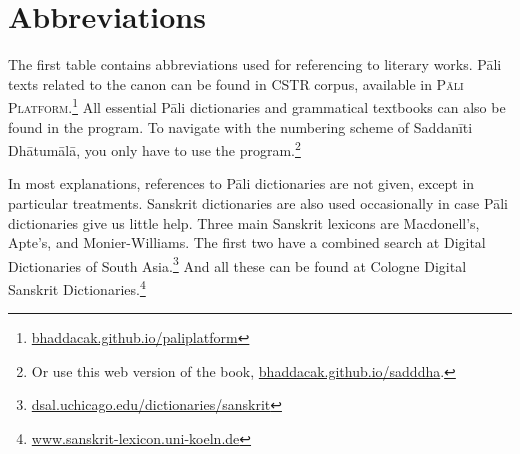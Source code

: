 \clearpage
{}
{}
\setcounter{footnote}{0}
\chapter*{Abbreviations}

The first table contains abbreviations used for referencing to literary works. Pāli texts related to the canon can be found in CSTR corpus, available in \textsc{Pāli\,Platform}.\footnote{\url{bhaddacak.github.io/paliplatform}} All essential Pāli dictionaries and grammatical textbooks can also be found in the program. To navigate with the numbering scheme of Saddanīti Dhātumālā, you only have to use the program.\footnote{Or use this web version of the book, \url{bhaddacak.github.io/sadddha}.}

In most explanations, references to Pāli dictionaries are not given, except in particular treatments. Sanskrit dictionaries are also used occasionally in case Pāli dictionaries give us little help. Three main Sanskrit lexicons are Macdonell's, Apte's, and Monier-Williams. The first two have a combined search at Digital Dictionaries of South Asia.\footnote{\url{dsal.uchicago.edu/dictionaries/sanskrit}} And all these can be found at Cologne Digital Sanskrit Dictionaries.\footnote{\url{www.sanskrit-lexicon.uni-koeln.de}}

